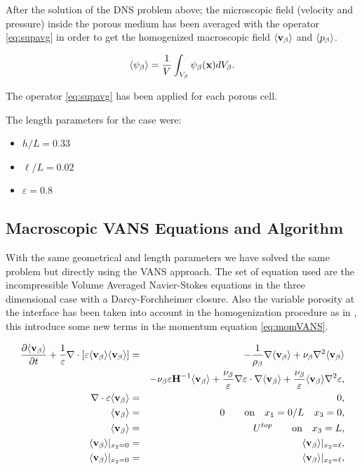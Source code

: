 After the solution of the DNS problem above; the microscopic field (velocity and pressure) inside the porous medium has been averaged with the operator \ref{eq:supavg} in order to get the homogenized macroscopic field ${\left< \textbf{v}_{\beta} \right>}$ and ${\left< p_{\beta} \right>}$.

\begin{equation}
	{\left< \psi_{\beta} \right>} = \dfrac{1}{V} \int_{V_\beta} \psi_\beta (\mathbf{x}) d V_\beta.
	\label{eq:supavg}
\end{equation}

The operator \eqref{eq:supavg} has been applied for each porous cell.

The length parameters for the case were:
\begin{itemize}
	\item $h/L=0.33$
	\item $\ell/L=0.02$
	\item $\varepsilon = 0.8$
\end{itemize}


\subsection{Macroscopic VANS Equations and Algorithm}

With the same geometrical and length parameters we have solved the same problem but directly using the VANS approach.
The set of equation used are the incompressible Volume Averaged Navier-Stokes equations in the three dimensional case with a Darcy-Forchheimer closure.
Also the variable porosity at the interface has been taken into account in the homogenization procedure as in \citet{breugem2006influence}, this introduce some new terms in the momentum equation \ref{eq:momVANS}.

\begin{eqnarray}
\dfrac{\partial {\left< \textbf{v}_{\beta} \right>}}{\partial t} + \dfrac{1}{\varepsilon} \nabla \cdot \left[  \varepsilon {\left< \textbf{v}_{\beta} \right>}  {\left< \textbf{v}_{\beta} \right>} \right] &=& -\frac{1}{\rho_{\beta}} \nabla {\left< \textbf{v}_{\beta} \right>} + \nu_{\beta} \nabla^2 {\left< \textbf{v}_{\beta} \right>} \\ 
& & - \nu_{\beta} \varepsilon \mathbf{H}^{-1} {\left< \textbf{v}_{\beta} \right>} +\dfrac{\nu_{\beta}}{\varepsilon} \nabla \varepsilon \cdot \nabla {\left< \textbf{v}_{\beta} \right>} + \dfrac{\nu_{\beta}}{\varepsilon} {\left< \textbf{v}_{\beta} \right>} \nabla^2 \varepsilon , \label{eq:momVANS}\\
\nabla \cdot \varepsilon {\left< \textbf{v}_{\beta} \right>} &=& 0, \label{eq:contVANS}\\
{\left< \textbf{v}_{\beta} \right>} &=& 0 \qquad \text{on} \quad x_1 = 0/L \quad x_3 = 0, \label{eq:noslipVANS}\\
{\left< \textbf{v}_{\beta} \right>} &=& U^{top} \qquad \text{on} \quad x_3 = L, \label{eq:veltopVANS}\\
{\left< \textbf{v}_{\beta} \right>}|_{x_2 = 0} &=& {\left< \textbf{v}_{\beta} \right>}|_{x_2 = \ell}, \label{eq:velperVANS}\\
{\left< \textbf{v}_{\beta} \right>}|_{x_2 = 0} &=& {\left< \textbf{v}_{\beta} \right>}|_{x_2 = \ell}, \label{eq:presspperVANS}
\end{eqnarray}

